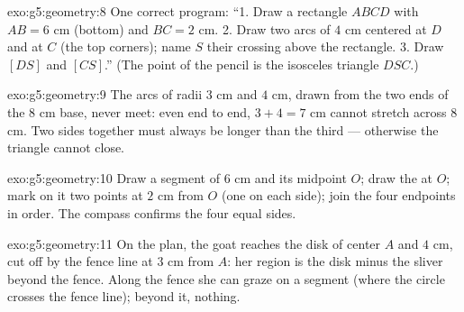 \begin{solution}{exo:g5:geometry:8}
One correct program: ``1. Draw a rectangle $ABCD$ with $AB = 6$ cm
(bottom) and $BC = 2$ cm. 2. Draw two arcs of  $4$ cm centered
at $D$ and at $C$ (the top corners); name $S$ their crossing above
the rectangle. 3. Draw $[DS]$ and $[CS]$.'' (The point of the pencil
is the isosceles triangle $DSC$.)
\end{solution}

\begin{solution}{exo:g5:geometry:9}
The arcs of radii $3$ cm and $4$ cm, drawn from the two ends of the
$8$ cm base, never meet: even end to end, $3 + 4 = 7$ cm cannot
stretch across $8$ cm. Two sides together must always be longer than
the third --- otherwise the triangle cannot close.
\end{solution}

\begin{solution}{exo:g5:geometry:10}
Draw a segment of $6$ cm and its midpoint $O$; draw the
 at $O$; mark on it two points at $2$ cm from $O$ (one
on each side); join the four endpoints in order. The compass
confirms the four equal sides.
\end{solution}

\begin{solution}{exo:g5:geometry:11}
On the plan, the goat reaches the disk of center $A$ and 
$4$ cm, cut off by the fence line at $3$ cm from $A$: her region is
the disk minus the sliver beyond the fence. Along the fence she can
graze on a segment (where the circle crosses the fence line);
beyond it, nothing.
\end{solution}
